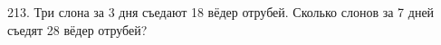 213. Три слона за 3 дня съедают 18 вёдер отрубей. Сколько слонов за 7 дней съедят 28 вёдер отрубей?\\
